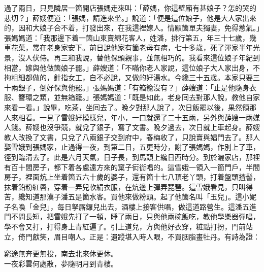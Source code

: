 過了兩日，只見隣居一箇開店張媽走來叫：「薛媽，你這壁廂有甚娘子？怎的哭的悲切？」薛嫂便道：「張媽，請進來坐。」說道：「便是這位娘子，他是大人家出來的，因和大娘子合不着，打發出來，在我這裡嫁人。情願箇單夫獨妻，免得惹氣。」張媽媽道：「我那邊下着一箇山東賣綿花客人，姓潘，排行第五，年三十七歲，幾車花菓，常在老身家安下。前日說他家有箇老母有病，七十多歲，死了渾家半年光景，沒人伏侍。再三和我說，替他保頭親事，並無相巧的。我看來這位娘子年紀到相當，嫁與他做箇娘子罷。」薛嫂道：「不瞞你老人家說，這位娘子大人家出身，不拘粗細都做的，針指女工，自不必說，又做的好湯水。今纔三十五歲。本家只要三十兩銀子，倒好保與他罷。」張媽媽道：「有箱籠沒有？」薛嫂道：「止是他隨身衣服、簪環之類，並無箱籠。」張媽媽道：「既是如此，老身囘去對那人說，教他自家來看一看。」說畢，吃茶，坐囘去了。晚夕對那人說了，次日飯罷以後，果然領那人來相看。一見了雪娥好模樣兒，年小，一口就還了二十五兩，另外與薛嫂一兩媒人錢。薛嫂也沒爭競，就兌了銀子，寫了文書。晚夕過去，次日就上車起身。薛嫂教人改換了文書，只兌了八兩銀子交到府中，春梅收了，只說賣與娼門去了。{}那人娶雪娥到張媽家，止過得一夜，到第二日，五更時分，謝了張媽媽，作別上了車，徑到臨清去了。此是六月天氣，日子長，到馬頭上纔日西時分。到於灑家店，那裡有百十間房子，都下着各處遠方來的窠子衏䘕唱的。這雪娥一領入一箇門戶，半間房子，裡面炕上坐着箇五六十歲的婆子，還有箇十七八頂老丫頭，打着盤頭揸髻，抹着鉛粉紅唇，穿着一弄兒軟絹衣服，在炕邊上彈弄琵琶。這雪娥看見，只叫得苦，纔知道那漢子潘五是箇水客。買他來做粉頭。起了他箇名叫「玉兒」。這小妮子名喚「金兒」，每日拏厮鑼兒出去，酒樓上接客供唱，做這道路營生。這潘五進門不問長短，把雪娥先打了一頓，睡了兩日，只與他兩碗飯吃，{}教他學樂器彈唱，學不會又打，打得身上青紅遍了。引上道兒，方與他好衣穿，粧點打扮，門前站立，倚門獻笑，眉目嘲人。正是：遺蹤堪入時人眼，不買胭脂畫牡丹。有詩為證：

\begin{myquote}
窮途無奔更無投，南去北來休更休。\\一夜彩雲何處散，夢隨明月到青樓。
\end{myquote}

